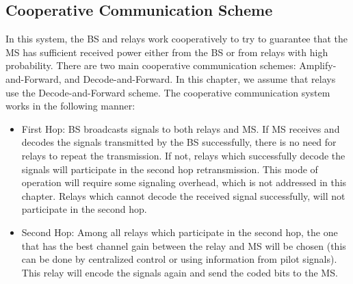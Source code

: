 \subsection{Cooperative Communication Scheme}
\label{Towhop}
\par In this system, the BS and relays work cooperatively to try to guarantee that the MS has sufficient received power either from the BS or from relays with high probability. There are two main cooperative communication schemes: Amplify-and-Forward, and Decode-and-Forward. In this chapter, we assume that relays use the Decode-and-Forward scheme. The cooperative communication system works in the following manner:
\begin{itemize}
\item First Hop: BS broadcasts signals to both relays and MS. If MS receives and decodes the signals transmitted by the BS successfully, there is no need for relays to repeat the transmission. If not, relays which successfully decode the signals will participate in the second hop retransmission. This mode of operation will require some signaling overhead, which is not addressed in this chapter. Relays which cannot decode the received signal successfully, will not participate in the second hop.
\item Second Hop: Among all relays which participate in the second hop, the one that has the best channel gain between the relay and MS will be chosen (this can be done by centralized control or using information from pilot signals). This relay will encode the signals again and send the coded bits to the MS.
\end{itemize}

